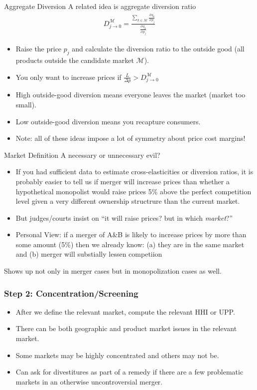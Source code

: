 \documentclass[aspectratio=169,10pt]{beamer}
\begin{document}
\begin{frame}{Aggregate Diversion}
A related idea is \alert{aggregate diversion ratio}
\begin{align*}
D_{j \rightarrow 0}^{\mathcal{M}} =  \frac{\sum_{k \in \mathcal{M}} \frac{\partial\, q_k}{\partial\, p_j}}{\frac{\partial\, q_k}{\partial\, p_j}}
\end{align*}
\begin{itemize}
    \item Raise the price $p_j$ and calculate the diversion ratio to the outside good (all products outside the candidate market $\mathcal{M}$).
    \item You only want to increase prices if $\frac{L}{ \Delta p} > D_{j \rightarrow 0}^{\mathcal{M}}$
    \item High outside-good diversion means everyone leaves the market (market too small).
    \item Low outside-good diversion means you recapture consumers.
    \item Note: all of these ideas impose a lot of symmetry about price cost margins!
\end{itemize}
\end{frame}

\begin{frame}{Market Definition}
A necessary or \alert{unnecessary} evil?
\begin{itemize}
    \item If you had sufficient data to estimate cross-elasticities or diversion ratios, it is probably easier to tell us if \alert{merger will increase prices} than whether a hypothetical monopolist would raise prices 5\% above the perfect competition level given a very different ownership structrure than the current market.
    \item But judges/courts insist on ``it will raise prices? but in which \textit{market}?''
    \item Personal View: if a merger of A\&B is likely to increase prices by more than some amount (5\%) then we already know: (a) they are in the same market and (b) merger will substially lessen competiion
\end{itemize}
Shows up not only in \alert{merger cases} but in \alert{monopolization cases} as well.
\end{frame}




\begin{frame}
\frametitle{Step 2: Concentration/Screening}
 \begin{itemize}
\item After we define the relevant market, compute the relevant HHI or UPP.
\item There can be both geographic and product market issues in the relevant market.
\item Some markets may be highly concentrated and others may not be.
\item Can ask for \alert{divestitures} as part of a \alert{remedy} if there are a few problematic markets in an otherwise uncontroversial merger.
 \end{itemize}
\end{frame}
\end{document}
